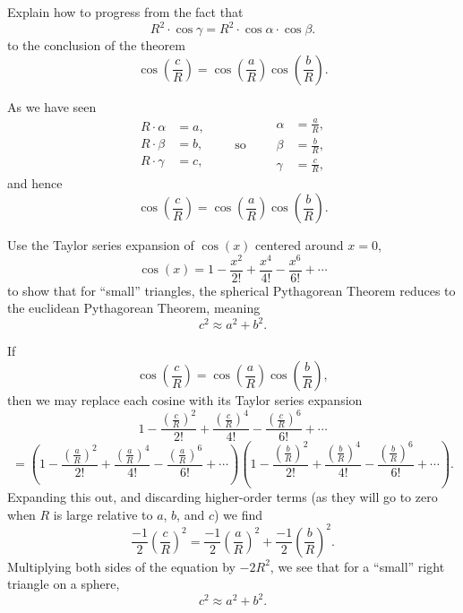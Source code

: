 \documentclass[newpage,hints,handout]{ximera}
\begin{document}
\begin{problem}
  Explain how to progress from the fact that
  \[
  R^2\cdot \cos \gamma = R^2 \cdot \cos\alpha \cdot \cos\beta.
  \]
  to the conclusion of the theorem
  \[
  \cos\left(\frac{c}{R}\right)=\cos\left(\frac{a}{R}\right)\cos\left(\frac{b}{R}\right).
  \]
  \begin{freeResponse}
    As we have seen
    \[
    \begin{split}
      R\cdot \alpha &= a,\\
      R\cdot \beta  &= b,\\
      R\cdot \gamma &= c,
    \end{split}
    \qquad\text{so}\qquad
    \begin{split}
      \alpha &= \frac{a}{R},\\
      \beta  &= \frac{b}{R},\\
      \gamma &= \frac{c}{R},
    \end{split}
    \]
    and hence
    \[
    \cos\left(\frac{c}{R}\right)=\cos\left(\frac{a}{R}\right)\cos\left(\frac{b}{R}\right).
    \]
  \end{freeResponse}
\end{problem}


\begin{problem}
  Use the Taylor series expansion of $\cos(x)$ centered around $x=0$,
  \[
  \cos(x) = 1 - \frac{x^2}{2!} + \frac{x^4}{4!} - \frac{x^6}{6!} + \cdots
  \]
to show that for ``small'' triangles, the spherical Pythagorean
Theorem reduces to the euclidean Pythagorean Theorem, meaning
\[
c^2 \approx a^2+b^2.
\]
\begin{freeResponse}
  If
  \[
  \cos\left(\frac{c}{R}\right)=\cos\left(\frac{a}{R}\right)\cos\left(\frac{b}{R}\right),
  \]
  then we may replace each cosine with its Taylor series expansion
  \[
  1 - \frac{\left(\frac{c}{R}\right)^2}{2!} + \frac{\left(\frac{c}{R}\right)^4}{4!} - \frac{\left(\frac{c}{R}\right)^6}{6!} + \cdots
  \]
  \[
  =\left(
  1 - \frac{\left(\frac{a}{R}\right)^2}{2!} + \frac{\left(\frac{a}{R}\right)^4}{4!} - \frac{\left(\frac{a}{R}\right)^6}{6!} + \cdots
  \right)
  \left(
  1 - \frac{\left(\frac{b}{R}\right)^2}{2!} + \frac{\left(\frac{b}{R}\right)^4}{4!} - \frac{\left(\frac{b}{R}\right)^6}{6!} + \cdots
  \right).
  \]
  Expanding this out, and discarding higher-order terms (as they will
  go to zero when $R$ is large relative to $a$, $b$, and $c$) we find
  \[
  \frac{-1}{2}\left(\frac{c}{R}\right)^2 = \frac{-1}{2}\left(\frac{a}{R}\right)^2+\frac{-1}{2}\left(\frac{b}{R}\right)^2.
  \]
  Multiplying both sides of the equation by $-2R^2$, we see that for a
  ``small'' right triangle on a sphere,
  \[
  c^2 \approx a^2 +b^2.
  \]
\end{freeResponse}
\end{problem}
\end{document}
